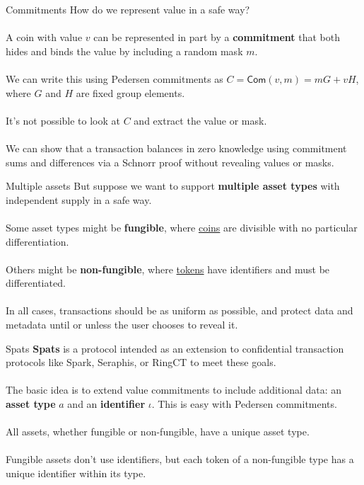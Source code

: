 \documentclass[aspectratio=169]{beamer}
\newcommand{\com}{\mathsf{Com}}
\begin{document}
\begin{frame}{Commitments}
	How do we represent value in a safe way? \\~\\

	A coin with value $v$ can be represented in part by a \textbf{commitment} that both hides and binds the value by including a random mask $m$. \\~\\

	We can write this using Pedersen commitments as $C = \com(v, m) = mG + vH$, where $G$ and $H$ are fixed group elements. \\~\\

	It's not possible to look at $C$ and extract the value or mask. \\~\\

	We can show that a transaction balances in zero knowledge using commitment sums and differences via a Schnorr proof without revealing values or masks.
\end{frame}

\begin{frame}{Multiple assets}
	But suppose we want to support \textbf{multiple asset types} with independent supply in a safe way. \\~\\

	Some asset types might be \textbf{fungible}, where \underline{coins} are divisible with no particular differentiation. \\~\\

	Others might be \textbf{non-fungible}, where \underline{tokens} have identifiers and must be differentiated. \\~\\

	In all cases, transactions should be as uniform as possible, and protect data and metadata until or unless the user chooses to reveal it.
\end{frame}

\begin{frame}{Spats}
	\textbf{Spats} is a protocol intended as an extension to confidential transaction protocols like Spark, Seraphis, or RingCT to meet these goals. \\~\\

	The basic idea is to extend value commitments to include additional data: an \textbf{asset type} $a$ and an \textbf{identifier} $\iota$.
	This is easy with Pedersen commitments. \\~\\

	All assets, whether fungible or non-fungible, have a unique asset type. \\~\\

	Fungible assets don't use identifiers, but each token of a non-fungible type has a unique identifier within its type.
\end{frame}
\end{document}
